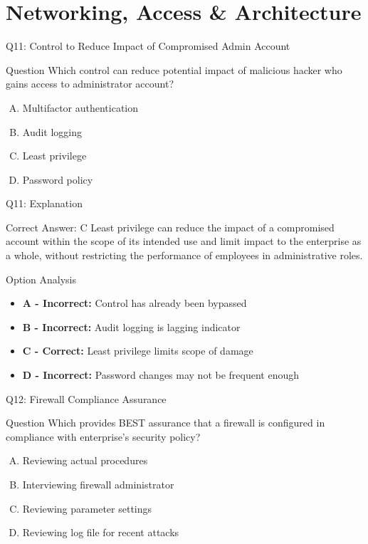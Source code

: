 \documentclass{beamer}
\begin{document}
	
	\section{Networking, Access \& Architecture}
	
	\begin{frame}{Q11: Control to Reduce Impact of Compromised Admin Account}
		\begin{block}{Question}
			Which control can reduce potential impact of malicious hacker who gains access to administrator account?
		\end{block}
		\begin{enumerate}[(A)]
			\item Multifactor authentication
			\item Audit logging
			\item Least privilege
			\item Password policy
		\end{enumerate}
	\end{frame}
	
	\begin{frame}{Q11: Explanation}
		\begin{block}{Correct Answer: C}
			Least privilege can reduce the impact of a compromised account within the scope of its intended use and limit impact to the enterprise as a whole, without restricting the performance of employees in administrative roles.
		\end{block}
		\begin{block}{Option Analysis}
			\begin{itemize}
				\item \textbf{A - Incorrect:} Control has already been bypassed
				\item \textbf{B - Incorrect:} Audit logging is lagging indicator
				\item \textbf{C - Correct:} Least privilege limits scope of damage
				\item \textbf{D - Incorrect:} Password changes may not be frequent enough
			\end{itemize}
		\end{block}
	\end{frame}
	
	\begin{frame}{Q12: Firewall Compliance Assurance}
		\begin{block}{Question}
			Which provides BEST assurance that a firewall is configured in compliance with enterprise's security policy?
		\end{block}
		\begin{enumerate}[(A)]
			\item Reviewing actual procedures
			\item Interviewing firewall administrator
			\item Reviewing parameter settings
			\item Reviewing log file for recent attacks
		\end{enumerate}
	\end{frame}
	
\end{document}
